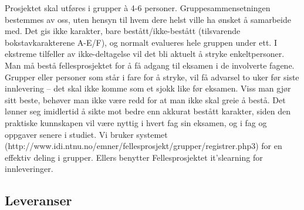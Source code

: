 \documentclass[a4paper]{scrartcl}
\begin{document}
Prosjektet skal utføres i grupper à 4-6 personer. Gruppesammensetningen bestemmes av oss, uten hensyn til hvem dere helst ville ha ønsket å samarbeide med. Det gis ikke karakter, bare bestått/ikke-bestått (tilsvarende bokstavkarakterene A-E/F), og normalt evalueres hele gruppen under ett. I ekstreme tilfeller av ikke-deltagelse vil det bli aktuelt å stryke enkeltpersoner. Man må bestå fellesprosjektet for å få adgang til eksamen i de involverte fagene. Grupper eller personer som står i fare for å stryke, vil få advarsel to uker før siste innlevering – det skal ikke komme som et sjokk like før eksamen. Viss man gjør sitt beste, behøver man ikke være redd for at man ikke skal greie å bestå. Det lønner seg imidlertid å sikte mot bedre enn akkurat bestått karakter, siden den praktiske kunnskapen vil være nyttig i hvert fag sin eksamen, og i fag og oppgaver senere i studiet.
Vi bruker systemet (http://www.idi.ntnu.no/emner/fellesprosjekt/grupper/registrer.php3) for en effektiv deling i grupper. Ellers benytter Fellesprosjektet it’slearning for innleveringer.

\newpage

\subsection{Leveranser}
\end{document}
